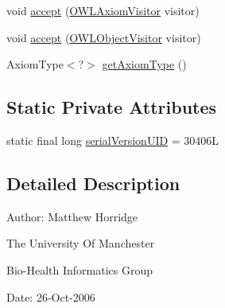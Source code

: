 \begin{DoxyCompactItemize}
\item 
void \hyperlink{classuk_1_1ac_1_1manchester_1_1cs_1_1owl_1_1owlapi_1_1_o_w_l_negative_data_property_assertion_axiom_impl_a6bdf5664a23fa472d05a6506180bd060}{accept} (\hyperlink{interfaceorg_1_1semanticweb_1_1owlapi_1_1model_1_1_o_w_l_axiom_visitor}{O\-W\-L\-Axiom\-Visitor} visitor)
\item 
void \hyperlink{classuk_1_1ac_1_1manchester_1_1cs_1_1owl_1_1owlapi_1_1_o_w_l_negative_data_property_assertion_axiom_impl_a5a48c6e020e645b3a6a5b2a3ed1627df}{accept} (\hyperlink{interfaceorg_1_1semanticweb_1_1owlapi_1_1model_1_1_o_w_l_object_visitor}{O\-W\-L\-Object\-Visitor} visitor)
\item 
Axiom\-Type$<$?$>$ \hyperlink{classuk_1_1ac_1_1manchester_1_1cs_1_1owl_1_1owlapi_1_1_o_w_l_negative_data_property_assertion_axiom_impl_a9221d53864d3149fad8ed5f656c9bc94}{get\-Axiom\-Type} ()
\end{DoxyCompactItemize}
\subsection*{Static Private Attributes}
\begin{DoxyCompactItemize}
\item 
static final long \hyperlink{classuk_1_1ac_1_1manchester_1_1cs_1_1owl_1_1owlapi_1_1_o_w_l_negative_data_property_assertion_axiom_impl_a9edf0826f48f30cd7e3b5cb6287ffe73}{serial\-Version\-U\-I\-D} = 30406\-L
\end{DoxyCompactItemize}


\subsection{Detailed Description}
Author\-: Matthew Horridge\par
 The University Of Manchester\par
 Bio-\/\-Health Informatics Group\par
 Date\-: 26-\/\-Oct-\/2006\par
\par
 

